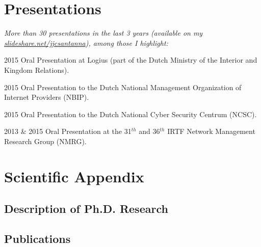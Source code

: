 \documentclass[print]{friggeri-cv} %
\begin{document}
\section{Presentations}
\emph{More than 30 presentations in the last 3 years (available on my  \href{http://www.slideshare.net/jjcsantanna}{slideshare.net/jjcsantanna}), among those I highlight:}

\begin{entrylist}

\vspace{-0.3cm}
\entry
{2015}
{Oral Presentation}
{at Logius (part of the Dutch Ministry of the Interior and Kingdom Relations).}

\vspace{-0.3cm}
\entry
{2015}
{Oral Presentation}
{to the Dutch National Management Organization of Internet Providers (NBIP).}

\vspace{-0.3cm}
\entry
{2015}
{Oral Presentation}
{to the Dutch National Cyber Security Centrum (NCSC).}

\vspace{-0.3cm}
\entry
{2013 \& 2015}
{Oral Presentation}
{at the 31$^{th}$ and 36$^{th}$ IRTF Network Management Research Group (NMRG).}

\end{entrylist}


\newpage
\section{Scientific Appendix}

\subsection{Description of Ph.D. Research}
\subsection{Publications}
\nocite{*}
\printbibliography[title={\emptyset}]
\end{document}
